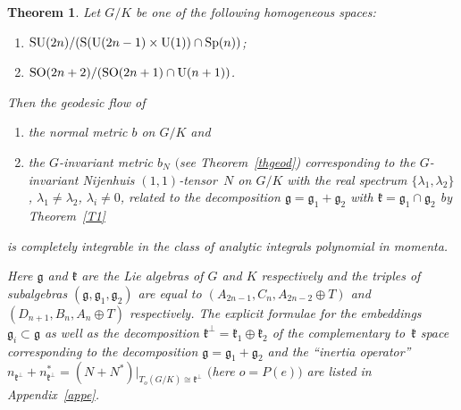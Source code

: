 \documentclass[pdftex]{sigma}
\numberwithin{equation}{section}
\newtheorem{Theorem}{Theorem}[section]
\begin{document}
\begin{Theorem}\label{appl} Let $G/K$ be one of the following homogeneous spaces:
\begin{enumerate}\itemsep=0pt
\item[$(a)$] ${\rm SU}(2n)/({\rm S}({\rm U}(2n-1)\times {\rm U}(1))\cap {\rm Sp}(n))$;
\item[$(b)$] ${\rm SO}(2n+2)/({\rm SO}(2n+1)\cap {\rm U}(n+1))$.
\end{enumerate}
Then the geodesic flow of
\begin{enumerate}\itemsep=0pt
\item[$1)$] the normal metric $b$ on $G/K$ and
\item[$2)$] the $G$-invariant metric $b_N$ $($see Theorem~{\rm \ref{thgeod})} corresponding to the $G$-invariant Nijenhuis $(1,1)$-tensor~$N$ on $G/K$ with the real spectrum $\{\lambda_1,\lambda_2\}$, $\lambda_1\not=\lambda_2$, $\lambda_i\not=0$, related to the decomposition $\mathfrak{g}=\mathfrak{g}_1+\mathfrak{g}_2$ with $\mathfrak{k}=\mathfrak{g}_1\cap\mathfrak{g}_2$ by Theorem~{\rm \ref{T1}}
 \end{enumerate}
is completely integrable in the class of analytic integrals polynomial in momenta.

Here $\mathfrak{g}$ and $\mathfrak{k}$ are the Lie algebras of $G$ and $K$ respectively and the triples of subalgebras $(\mathfrak{g},\mathfrak{g}_1,\mathfrak{g}_2)$ are equal to $(A_{2n-1},C_n,A_{2n-2}\oplus T)$ and $(D_{n+1},B_n,A_n\oplus T)$ respectively. The explicit formulae for the embeddings $\mathfrak{g}_i\subset \mathfrak{g}$ as well as the decomposition $\mathfrak{k}^\perp=\mathfrak{k}_1\oplus\mathfrak{k}_2$ of the complementary to~$\mathfrak{k}$ space corresponding to the decomposition $\mathfrak{g}=\mathfrak{g}_1+\mathfrak{g}_2$ and the ``inertia operator'' $n_{\mathfrak{k}^\perp}+n_{\mathfrak{k}^\perp}^*=(N+N^*)|_{T_o(G/K)\cong \mathfrak{k}^\perp}$ $($here $o=P(e))$ are listed in Appendix~{\rm \ref{appe}}.
\end{Theorem}
\end{document}
